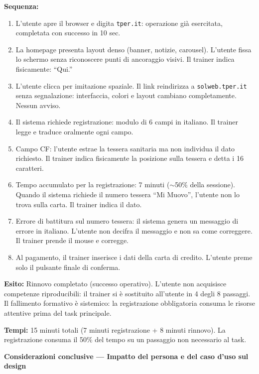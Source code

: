 ﻿\documentclass[11pt,a4paper]{article}
\begin{document}
\begin{center}
\begin{tcolorbox}[base]
{    \textbf{Sequenza:}
    \begin{enumerate}
        \item L'utente apre il browser e digita \texttt{tper.it}: operazione già esercitata, completata con successo in 10 sec.
        \item La homepage presenta layout denso (banner, notizie, carousel). L'utente fissa lo schermo senza riconoscere punti di ancoraggio visivi. Il trainer indica fisicamente: ``Qui.''
        \item L'utente clicca per imitazione spaziale. Il link reindirizza a \texttt{solweb.tper.it} senza segnalazione: interfaccia, colori e layout cambiano completamente. Nessun avviso.
        \item Il sistema richiede registrazione: modulo di 6 campi in italiano. Il trainer legge e traduce oralmente ogni campo.
        \item Campo CF: l'utente estrae la tessera sanitaria ma non individua il dato richiesto. Il trainer indica fisicamente la posizione sulla tessera e detta i 16 caratteri.
        \item Tempo accumulato per la registrazione: 7 minuti ($\sim$50\% della sessione). Quando il sistema richiede il numero tessera ``Mi Muovo'', l'utente non lo trova sulla carta. Il trainer indica il dato.
        \item Errore di battitura sul numero tessera: il sistema genera un messaggio di errore in italiano. L'utente non decifra il messaggio e non sa come correggere. Il trainer prende il mouse e corregge.
        \item Al pagamento, il trainer inserisce i dati della carta di credito. L'utente preme solo il pulsante finale di conferma.
    \end{enumerate}

    \textbf{Esito:} Rinnovo completato (successo operativo). L'utente non acquisisce competenze riproducibili: il trainer si è sostituito all'utente in 4 degli 8 passaggi. Il fallimento formativo è sistemico: la registrazione obbligatoria consuma le risorse attentive prima del task principale.

    \textbf{Tempi:} 15 minuti totali (7 minuti registrazione + 8 minuti rinnovo). La registrazione consuma il 50\% del tempo su un passaggio non necessario al task.
    }
\end{tcolorbox}

\begin{tcolorbox}[sectionbox,colback=primaryColor!10]
    \textbf{Considerazioni conclusive --- Impatto del persona e del caso d'uso sul design}
\end{tcolorbox}


\end{center}
\end{document}
